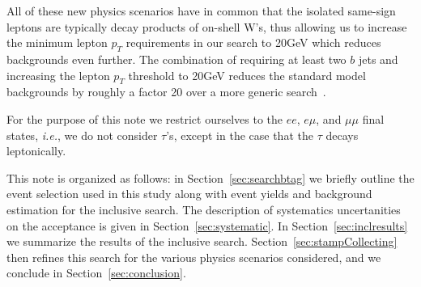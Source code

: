 All of these new physics scenarios have in common that the isolated same-sign leptons are typically decay products of on-shell W's,
thus allowing us to increase the minimum lepton $p_T$ requirements in our search to 20GeV which reduces backgrounds even further.
The combination of requiring at least two $b$ jets and increasing the lepton $p_T$ threshold to 20GeV reduces the standard model backgrounds
by roughly a factor 20 over a more generic search~\cite{sspaper}.

 
For the purpose of this note we restrict ourselves to the $ee$, $e\mu$, and $\mu\mu$ 
final states, {\em i.e.}, we do not consider $\tau$'s, except in the case that the $\tau$ decays leptonically.

This note is organized as follows: in Section~\ref{sec:searchbtag} we briefly outline the event selection used in this study 
along with event yields and background estimation for the inclusive search.
%
The description of systematics uncertanities on the 
acceptance is given in Section~\ref{sec:systematic}.  
%
In Section~\ref{sec:inclresults} we summarize the results 
of the inclusive search.
Section~\ref{sec:stampCollecting} then refines this search for the various physics scenarios considered, and
we conclude in Section~\ref{sec:conclusion}.






